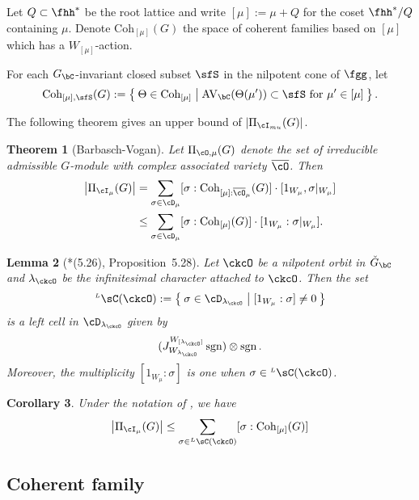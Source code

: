 \documentclass[12pt,a4paper]{amsart}
\newcommand{\AVC}{\mathrm{AV}_\bC}
\def\abs#1{\left|{#1}\right|}
\newcommand{\sgn}{\operatorname{sgn}}
\numberwithin{equation}{section}
\newtheorem{thm}{Theorem}[section]
\newtheorem{lem}[thm]{Lemma}
\newtheorem{cor}[thm]{Corollary}
\theoremstyle{remark}
\def\PI#1{\Pi_{\cI_{#1}}}
\def\ckGc{\check{G}_{\bC}}
\def\lamck{\lambda_\ckcO}
\def\Gc{G_\bC}
\def\WLamck{W_{[\lambda_{\ckcO}]}}
\def\Wlamck{W_{\lamck}}
\def\LC{{}^{\scriptscriptstyle L}\sC}
\def\Coh{\mathrm{Coh}}
\begin{document}
Let $Q\subset \fhh^{*}$ be the root lattice and write $[\mu]:= \mu+Q$ for the coset
$\fhh^{*}/Q$ containing $\mu$.
Denote
$\Coh_{[\mu]}(G)$ the space of coherent families based on $[\mu]$ which has a $W_{[\mu]}$-action.

For each $\Gc$-invariant closed subset $\sfS$ in the nilpotent
cone of $\fgg$, let
\[
  \Coh_{[\mu], \sfS}(G):= \Set{
    \Theta \in \Coh_{[\mu]}|\AVC(\Theta(\mu')) \subset \sfS \text{ for }\mu'\in [\mu]}.
\]

The following theorem gives an upper bound of $\abs{\PI{mu}(G)}$.

\begin{thm}[Barbasch-Vogan]\label{thm:count}
  Let $\Pi_{\cO,\mu}(G)$ denote the set of irreducible admissible $G$-module with
  complex associated variety $\overline{\cO}$.
  Then
  \[
    \begin{split}
      \abs{\PI{\mu}(G)} &= \sum_{\sigma\in \cD_{\mu}} [\sigma: \Coh_{[\mu]:\bcO_{\mu}}(G)] \cdot
      [1_{W_{\mu}}, \sigma|_{W_{\mu}}]\\
      & \leq \sum_{\sigma\in \cD_{\mu}} [\sigma: \Coh_{[\mu]}(G)] \cdot [1_{W_{\mu}}: \sigma|_{W_{\mu}}].
    \end{split}
  \]
\end{thm}



 \begin{lem}[{\cite{BVUni}*{(5.26), Proposition~5.28}}]\label{lem:lcell.BV}
  Let $\ckcO$ be a nilpotent orbit in $\ckGc$ and $\lamck$ be the infinitesimal
  character attached to $\ckcO$.
  Then the set
  \[
    \LC(\ckcO) := \Set{ \sigma \in \cD_{\lamck}| [1_{W_{\mu}}:\sigma]\neq 0}
  \]
  is a left cell in $\cD_{\lamck}$ given by
  \[
    (J_{\Wlamck}^{\WLamck} \sgn )\otimes \sgn.
  \]
  Moreover, the multiplicity $[1_{W_{\mu}}:\sigma]$ is one
  when $\sigma\in \LC(\ckcO)$.
\end{lem}

\begin{cor}
  Under the notation of , we have
  \[
    \abs{\PI{\mu}(G)} \leq \sum_{\sigma\in \LC(\ckcO)} [\sigma: \Coh_{[\mu]}(G)]
  \]
\end{cor}

\subsection{Coherent family}
\end{document}
